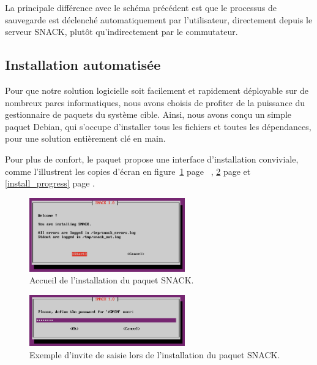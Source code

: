La principale différence avec le schéma précédent est que le processus de sauvegarde est déclenché automatiquement par l'utilisateur, directement depuis le serveur SNACK, plutôt qu'indirectement par le commutateur.

\subsection{Installation automatisée}

Pour que notre solution logicielle soit facilement et rapidement déployable sur de nombreux parcs informatiques, nous avons choisis de profiter de la puissance du gestionnaire de paquets du système cible. Ainsi, nous avons conçu un simple paquet Debian, qui s'occupe d'installer tous les fichiers et toutes les dépendances, pour une solution entièrement clé en main.

Pour plus de confort, le paquet propose une interface d'installation conviviale, comme l'illustrent les copies d'écran en figure~\ref{install_start} page ~\pageref{install_start}, \ref{install_prompt} page \pageref{install_prompt} et \ref{install_progress} page \pageref{install_progress}.

\begin{figure}[!h]
	\begin{center}
	    \includegraphics[width=0.6\textwidth]{img/install_start.png}
	\end{center}
	\caption{Accueil de l'installation du paquet SNACK.}
	\label{install_start}
\end{figure}

\begin{figure}[!h]
	\begin{center}
	    \includegraphics[width=0.6\textwidth]{img/install_prompt.png}
	\end{center}
	\caption{Exemple d'invite de saisie lors de l'installation du paquet SNACK.}
	\label{install_prompt}
\end{figure}

